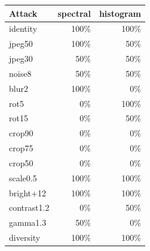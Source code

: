 \begin{tabular}{lrr}
\toprule
Attack & spectral & histogram \\
\midrule
identity & 100\% & 100\% \\
jpeg50 & 100\% & 50\% \\
jpeg30 & 50\% & 50\% \\
noise8 & 50\% & 50\% \\
blur2 & 100\% & 0\% \\
rot5 & 0\% & 100\% \\
rot15 & 0\% & 50\% \\
crop90 & 0\% & 0\% \\
crop75 & 0\% & 0\% \\
crop50 & 0\% & 0\% \\
scale0.5 & 100\% & 100\% \\
bright+12 & 100\% & 100\% \\
contrast1.2 & 0\% & 50\% \\
gamma1.3 & 50\% & 0\% \\
\midrule
diversity & 100\% & 100\% \\
\bottomrule
\end{tabular}
